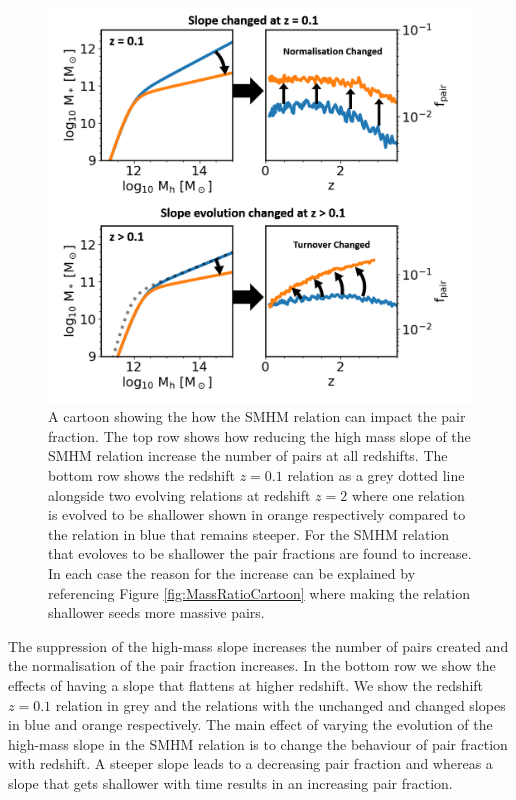 \begin{figure}[h]
	\centering
	\includegraphics[width = \linewidth]{Figures/Chapter5/SMHM_PF_Cartoon.png}
	\caption{A cartoon showing the how the SMHM relation can impact the pair fraction. The top row shows how reducing the high mass slope of the SMHM relation increase the number of pairs at all redshifts. The bottom row shows the redshift $z=0.1$ relation as a grey dotted line alongside two evolving relations at redshift $z=2$ where one relation is evolved to be shallower shown in orange respectively compared to the relation in blue that remains steeper. For the SMHM relation that evoloves to be shallower the pair fractions are found to increase. In each case the reason for the increase can be explained by referencing Figure \ref{fig:MassRatioCartoon} where making the relation shallower seeds more massive pairs.}
	\label{fig:SMHM_PF_Cartoon}
\end{figure}

The suppression of the high-mass slope increases the number of pairs created and the normalisation of the pair fraction increases. 
In the bottom row we show the effects of having a slope that flattens at higher redshift. 
We show the redshift $z=0.1$ relation in grey and the relations with the unchanged and changed slopes in blue and orange respectively. 
The main effect of varying the evolution of the high-mass slope in the SMHM relation is to change the behaviour of pair fraction with redshift. 
A steeper slope leads to a decreasing pair fraction and whereas a slope that gets shallower with time results in an increasing pair fraction.


